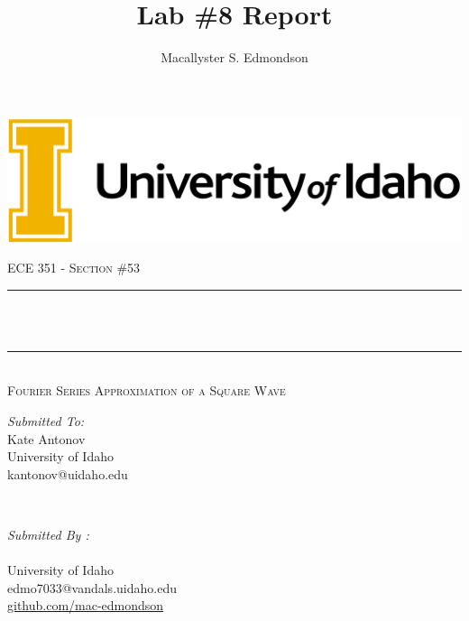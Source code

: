 \documentclass[12pt]{report}
\title{Lab \#8 Report}
\author{Macallyster S. Edmondson}
\date{\longdate\displaydate{date}}
\makeatletter
\let\thetitle\@title
\let\theauthor\@author
\makeatother
\begin{document}
\begin{titlepage}\thispagestyle{titlepage}
\centering
\includegraphics[scale = 0.12]{univ-logo.png}\\[1.0 cm]
\begin{center}    \textsc{\Large   ECE 351 - Section \#53 }\\[2.0 cm]
\end{center}%

\rule{\linewidth}{0.2 mm} \\[0.4 cm]
{ \huge \bfseries \thetitle}\\
\rule{\linewidth}{0.2 mm} \\[0.5 cm]
\textsc{\Large Fourier Series Approximation of a Square Wave }\\[1.5 cm] %
\begin{minipage}{0.4\textwidth}
\begin{flushleft} \large
\emph{Submitted To:}\\
Kate Antonov\\ \small
University of Idaho\\
kantonov@uidaho.edu\\
\hfill
\end{flushleft}
\end{minipage}~
\begin{minipage}{0.4\textwidth}
\begin{flushright} \large
\emph{Submitted By :} \\
\theauthor \\ \small
University of Idaho\\
edmo7033@vandals.uidaho.edu\\
\href{http://github.com/mac-edmondson}{github.com/mac-edmondson}\\
\end{flushright}
\end{minipage}\\[2 cm]
\vfill
\end{titlepage}
\tableofcontents\thispagestyle{customplain}
\pagebreak
\renewcommand{\thesection}{\arabic{section}}
\end{document}
